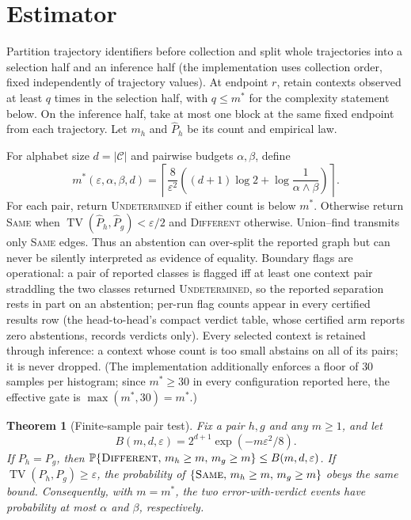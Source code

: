 \documentclass{article}
\newtheorem{theorem}{Theorem}
\newcommand{\cC}{\mathcal C}
\newcommand{\Prb}{\mathbb P}
\newcommand{\eps}{\varepsilon}
\DeclareMathOperator{\TV}{TV}
\begin{document}
\section{Estimator}\label{sec:estimator}

Partition trajectory identifiers before collection and split whole trajectories
into a selection half and an inference half (the implementation uses collection
order, fixed independently of trajectory values).  At endpoint
$r$, retain contexts observed at least $q$ times in the selection half, with
$q\le m^*$ for the complexity statement below.  On
the inference half, take at most one block at the same fixed endpoint from
each trajectory.  Let $m_h$ and $\widehat P_h$ be its count and empirical law.

For alphabet size $d=|\cC|$ and pairwise budgets $\alpha,\beta$, define
\begin{equation}
m^*(\eps,\alpha,\beta,d)=
\left\lceil \frac{8}{\eps^2}
\left((d+1)\log2+\log\frac{1}{\alpha\wedge\beta}\right)
\right\rceil .                                        \label{eq:mstar}
\end{equation}
For each pair, return \textsc{Undetermined} if either count is below $m^*$.
Otherwise return \textsc{Same} when
$\TV(\widehat P_h,\widehat P_g)<\eps/2$ and
\textsc{Different} otherwise.  Union--find transmits only \textsc{Same}
edges.  Thus an abstention can over-split the reported graph but can never be
silently interpreted as evidence of equality.  Boundary flags are
operational: a pair of reported classes is flagged iff at least one context
pair straddling the two classes returned \textsc{Undetermined}, so the
reported separation rests in part on an abstention; per-run flag counts
appear in every certified results row (the head-to-head's compact verdict
table, whose certified arm reports zero abstentions, records verdicts
only).  Every selected context is
retained through inference: a context whose count is too small abstains on
all of its pairs; it is never dropped.  (The implementation additionally
enforces a floor of $30$ samples per histogram; since $m^*\ge30$ in every
configuration reported here, the effective gate is $\max(m^*,30)=m^*$.)

\begin{theorem}[Finite-sample pair test]                 \label{thm:pair}
Fix a pair $h,g$ and any $m\ge1$, and let
\begin{equation}
  B(m,d,\eps)=2^{d+1}\exp(-m\eps^2/8).                  \label{eq:bound}
\end{equation}
If $P_h=P_g$, then
$\Prb\{\textnormal{\textsc{Different}},\, m_h\ge m,\, m_g\ge m\}\le
B(m,d,\eps)$.  If $\TV(P_h,P_g)\ge\eps$, the probability of
$\{\textnormal{\textsc{Same}},\, m_h\ge m,\, m_g\ge m\}$ obeys the same
bound.  Consequently, with $m=m^*$, the two error-with-verdict events have
probability at most $\alpha$ and $\beta$, respectively.
\end{theorem}
\end{document}
